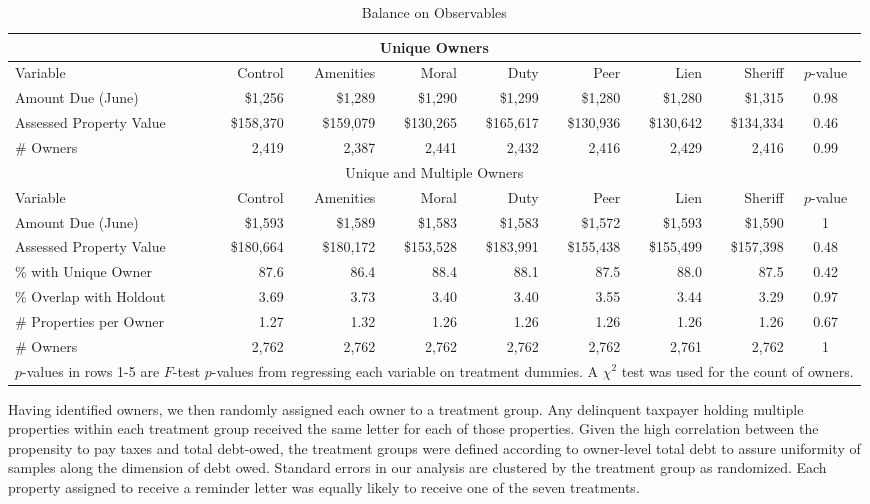 \documentclass[12pt]{article}
\begin{document}
\begin{sidewaystable}[htbp]
\centering
\caption{Balance on Observables}\label{balance}
\bigskip
\begin{tabular}{lrrrrrrrc}
\hline
\multicolumn{9}{c}{Unique Owners} \\
\hline
Variable & Control & Amenities & Moral & Duty & Peer & Lien & Sheriff & $p$-value \\ 
\hline
Amount Due (June) & \$1,256 & \$1,289 & \$1,290 & \$1,299 & \$1,280 & \$1,280 & \$1,315 & 0.98 \\ 
Assessed Property Value & \$158,370 & \$159,079 & \$130,265 & \$165,617 & \$130,936 & \$130,642 &
 \$134,334 & 0.46 \\ 
\# Owners & 2,419 & 2,387 & 2,441 & 2,432 & 2,416 & 2,429 & 2,416 & 0.99 \\ 
\hline
\multicolumn{9}{c}{Unique and Multiple Owners} \\
\hline
Variable & Control & Amenities & Moral & Duty & Peer & Lien & Sheriff & $p$-value \\ 
\hline
Amount Due (June) & \$1,593 & \$1,589 & \$1,583 & \$1,583 & \$1,572 & \$1,593 & \$1,590 & 1 \\ 
Assessed Property Value & \$180,664 & \$180,172 & \$153,528 & \$183,991 & \$155,438 & \$155,499 & \$157,398 & 0.48 \\ 
\% with Unique Owner & 87.6 & 86.4 & 88.4 & 88.1 & 87.5 & 88.0 & 87.5 & 0.42 \\ 
\% Overlap with Holdout & 3.69 & 3.73 & 3.40 & 3.40 & 3.55 & 3.44 & 3.29 & 0.97 \\ 
\# Properties per Owner & 1.27 & 1.32 & 1.26 & 1.26 & 1.26 & 1.26 & 1.26 & 0.67 \\ 
\# Owners & 2,762 & 2,762 & 2,762 & 2,762 & 2,762 & 2,761 & 2,762 & 1 \\ 
\hline
\multicolumn{9}{l}{\scriptsize{$p$-values in rows 1-5 are $F$-test
    $p$-values from regressing each variable on treatment dummies. A
    $\chi^2$ test was used for the count of owners.}} \\
\end{tabular}
\end{sidewaystable}

Having identified owners, we then randomly assigned each owner to a
treatment group.  Any delinquent taxpayer holding multiple properties
within each treatment group received the same letter for each of those
properties.  Given the high correlation between the propensity to pay
taxes and total debt-owed, the treatment groups were defined according
to owner-level total debt to assure uniformity of samples along the
dimension of debt owed.  Standard errors in our analysis are clustered
by the treatment group as randomized.  Each property assigned to
receive a reminder letter was equally likely to receive one of the
seven treatments.
\end{document}
